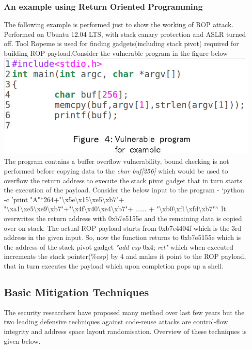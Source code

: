 \documentclass{article}
\begin{document}
\begin{multicols}{2}
	\subsubsection{An example using Return Oriented Programming}
	The following example is performed just to show the working of ROP attack. Performed on Ubuntu 12.04 LTS, with stack canary protection and ASLR turned off. Tool Ropeme\cite{ropeme} is used for finding gadgets(including stack pivot) required for building ROP payload.\break	Consider the vulnerable program in the figure below
	\break \break
	\includegraphics[scale=.27]{vul_prog.jpg}\break \break
	The program contains a buffer overflow vulnerability, bound checking is not performed before copying data to the \textit{char buf[256]} which would be used to overflow the return address to execute the stack pivot gadget that in turn starts the execution of the payload.\break
	Consider the below input to the program - \break
	`python -c 'print "A"*264+"\textbackslash x5e\textbackslash x15\textbackslash xe5\textbackslash xb7"+ "\textbackslash xa1\textbackslash xe5\textbackslash xe9\textbackslash xb7"+"\textbackslash x4f\textbackslash x40\textbackslash xe4\textbackslash xb7"+ $\ldots\ldots$ + "\textbackslash xb0\textbackslash xf1\textbackslash xfd\textbackslash xb7"'` \break
	It overwrites the return address with 0xb7e5155e and the remaining data is copied over on stack. The actual ROP payload starts from 0xb7e4404f which is the 3rd address in the given input. So, now the function returns to 0xb7e5155e which is the address of the stack pivot gadget \textit{"add esp} 0x4;\textit{ ret"} which when executed increments the stack pointer(\%esp) by 4 and makes it point to the ROP payload, that in turn executes the payload which upon completion pops up a shell.
	
	\subsection{Basic Mitigation Techniques}
	The security researchers have proposed many method over last few years but the two leading defensive techniques against code-reuse attacks are control-flow integrity and address space layout randomisation. Overview of these techniques is given below.
	

\end{multicols}
\end{document}
